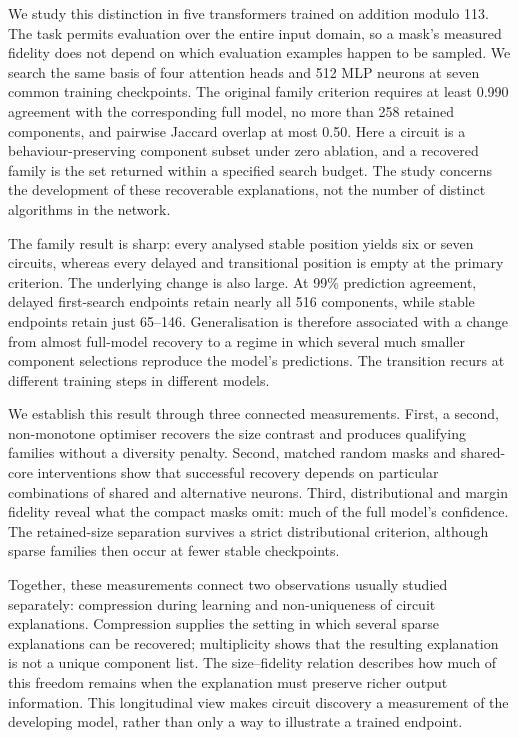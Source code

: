We study this distinction in five transformers trained on addition modulo 113. The task permits evaluation over the entire input domain, so a mask's measured fidelity does not depend on which evaluation examples happen to be sampled. We search the same basis of four attention heads and 512 MLP neurons at seven common training checkpoints. The original family criterion requires at least 0.990 agreement with the corresponding full model, no more than 258 retained components, and pairwise Jaccard overlap at most 0.50. Here a circuit is a behaviour-preserving component subset under zero ablation, and a recovered family is the set returned within a specified search budget. The study concerns the development of these recoverable explanations, not the number of distinct algorithms in the network.

The family result is sharp: every analysed stable position yields six or seven circuits, whereas every delayed and transitional position is empty at the primary criterion. The underlying change is also large. At 99\% prediction agreement, delayed first-search endpoints retain nearly all 516 components, while stable endpoints retain just 65--146. Generalisation is therefore associated with a change from almost full-model recovery to a regime in which several much smaller component selections reproduce the model's predictions. The transition recurs at different training steps in different models.

We establish this result through three connected measurements. First, a second, non-monotone optimiser recovers the size contrast and produces qualifying families without a diversity penalty. Second, matched random masks and shared-core interventions show that successful recovery depends on particular combinations of shared and alternative neurons. Third, distributional and margin fidelity reveal what the compact masks omit: much of the full model's confidence. The retained-size separation survives a strict distributional criterion, although sparse families then occur at fewer stable checkpoints.

Together, these measurements connect two observations usually studied separately: compression during learning and non-uniqueness of circuit explanations. Compression supplies the setting in which several sparse explanations can be recovered; multiplicity shows that the resulting explanation is not a unique component list. The size--fidelity relation describes how much of this freedom remains when the explanation must preserve richer output information. This longitudinal view makes circuit discovery a measurement of the developing model, rather than only a way to illustrate a trained endpoint.

